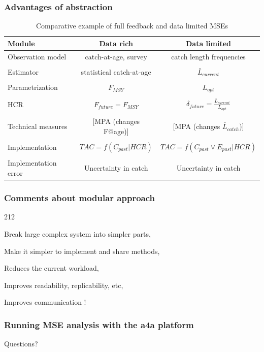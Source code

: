 \documentclass{beamer}
\begin{document}
\begin{frame}
\frametitle{Advantages of abstraction}

\footnotesize

\begin{table}
	\begin{tabular}{l|c|c}
		\hline 
		Module	& Data rich & Data limited \\ 
		\hline 
		\hline 
		Observation model	&  catch-at-age, survey & catch length frequencies \\ 
    & & \\
		Estimator	& statistical catch-at-age &  $\bar{L}_{current}$ \\ 
    & & \\
		Parametrization	& $F_{MSY}$ &  $L_{opt}$ \\ 
    & & \\
		HCR	& $F_{future}=F_{MSY}$ & $\delta_{future}=\frac{\bar{L}_{current}}{L_{opt}}$ \\ 
    & & \\
		Technical measures	& [MPA (changes F@age)] & [MPA (changes $\bar{L}_{catch}$)] \\ 
    & & \\
		Implementation	& $TAC=f(C_{past}|HCR)$ & $TAC=f(C_{past} \lor E_{past}|HCR)$ \\ 
    & & \\
		Implementation error	& Uncertainty in catch & Uncertainty in catch \\ 
		\hline 
	\end{tabular} 
	
	\caption{Comparative example of full feedback and data limited MSEs}
\end{table}

\end{frame}

\begin{frame}
\frametitle{Comments about modular approach}

\Large

\begin{dinglist}{212}
  \item Break large complex system into simpler parts,
	\item Make it simpler to implement and share methods,
	\item Reduces the current workload,
	\item Improves readability, replicability, etc, 
	\item Improves communication !
\end{dinglist}

\end{frame}


\begin{frame}
	\frametitle{Running MSE analysis with the a4a platform}
	
	\centering Questions?
	
\end{frame}
\end{document}
